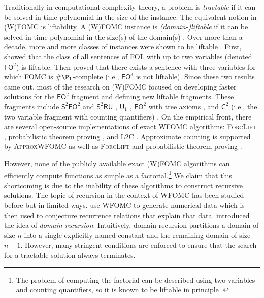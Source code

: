\documentclass[letterpaper]{article} %
\newcommand{\FOtwo}{$\mathsf{FO}^{2}$}
\newcommand{\FOthree}{$\mathsf{FO}^{3}$}
\newcommand{\SFO}{$\mathsf{S}^{2}\mathsf{FO}^{2}$}
\newcommand{\SRU}{$\mathsf{S}^{2}\mathsf{RU}$}
\newcommand{\Uone}{$\mathsf{U}_{1}$}
\newcommand{\Ctwo}{$\mathsf{C}^{2}$}
\theoremstyle{definition}
\begin{document}

Traditionally in computational complexity theory, a problem is \emph{tractable}
if it can be solved in time polynomial in the size of the instance. The
equivalent notion in (W)FOMC is liftability. A (W)FOMC instance is
\emph{(domain-)liftable} if it can be solved in time polynomial in the size(s)
of the domain(s) \citep{jaeger2012liftability}. Over more than a decade, more
and more classes of instances were shown to be liftable
\citep{DBLP:conf/kr/BremenK21,DBLP:conf/nips/KazemiKBP16,DBLP:conf/lics/KuusistoL18,DBLP:journals/jair/Kuzelka21}.
First, \citet{DBLP:conf/nips/Broeck11} showed that the class of all sentences of
FOL with up to two variables (denoted \FOtwo{}) is liftable. Then
\citet{DBLP:conf/pods/BeameBGS15} proved that there exists a sentence with three
variables for which FOMC is $\#\P_{1}$-complete (i.e., \FOthree{} is not
liftable). Since these two results came out, most of the research on (W)FOMC
focused on developing faster solutions for the \FOtwo{} fragment
\citep{DBLP:conf/uai/BremenK21,DBLP:conf/aaai/MalhotraS22} and defining
new liftable fragments. These fragments include \SFO{} and \SRU{}
\citep{DBLP:conf/nips/KazemiKBP16}, \Uone{} \citep{DBLP:conf/lics/KuusistoL18},
\FOtwo{} with tree axioms \citep{DBLP:conf/kr/BremenK21}, and \Ctwo{} (i.e., the
two variable fragment with counting quantifiers)
\citep{DBLP:journals/jair/Kuzelka21,DBLP:conf/aaai/MalhotraS22}. On the
empirical front, there are several open-source implementations of exact WFOMC
algorithms: \textsc{ForcLift} \citep{DBLP:conf/ijcai/BroeckTMDR11},
probabilistic theorem proving \citep{DBLP:journals/cacm/GogateD16}, and
\textsc{L2C} \citep{DBLP:conf/kr/KazemiP16}. Approximate counting is supported
by \textsc{ApproxWFOMC} \citep{DBLP:conf/ijcai/BremenK20} as well as
\textsc{ForcLift} \citep{DBLP:conf/uai/BroeckCD12} and probabilistic theorem
proving \citep{DBLP:journals/cacm/GogateD16}.


However, none of the publicly available exact (W)FOMC algorithms can efficiently
compute functions as simple as a factorial.\footnote{The problem of computing
  the factorial can be described using two variables and counting quantifiers,
  so it is known to be liftable in principle
  \citep{DBLP:journals/jair/Kuzelka21}.} We claim that this shortcoming is due
to the inability of these algorithms to construct recursive solutions. The topic
of recursion in the context of WFOMC has been studied before but in limited
ways.  use WFOMC to generate numerical data
which is then used to conjecture recurrence relations that explain that data.
 introduced the idea of \emph{domain recursion}.
Intuitively, domain recursion partitions a domain of size $n$ into a single
explicitly named constant and the remaining domain of size $n-1$. However, many
stringent conditions are enforced to ensure that the search for a tractable
solution always terminates.
\end{document}
